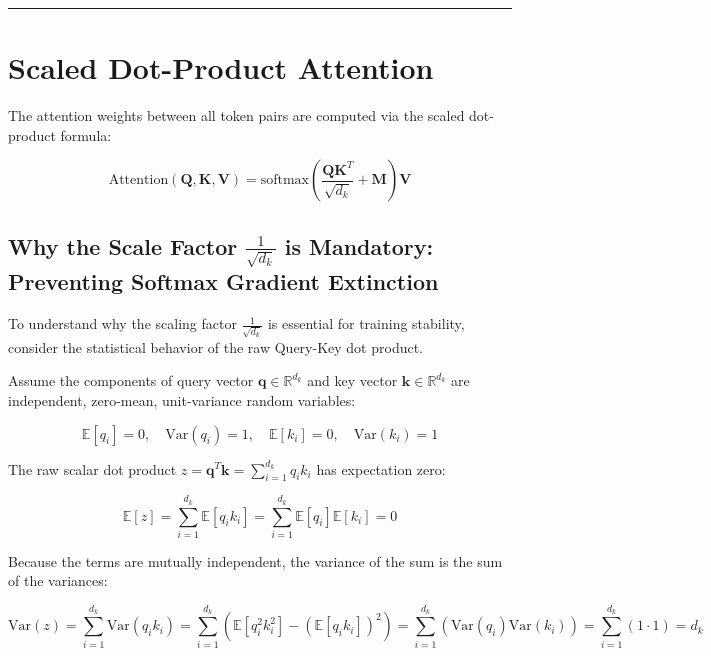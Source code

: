 \documentclass[
  letterpaper,
]{scrbook}
\begin{document}
\begin{center}\rule{0.5\linewidth}{0.5pt}\end{center}

\section{Scaled Dot-Product
Attention}\label{scaled-dot-product-attention}

The attention weights between all token pairs are computed via the
scaled dot-product formula:

\[\text{Attention}(\mathbf{Q}, \mathbf{K}, \mathbf{V}) = \text{softmax}\left( \frac{\mathbf{Q} \mathbf{K}^T}{\sqrt{d_k}} + \mathbf{M} \right) \mathbf{V}\]

\subsection{\texorpdfstring{Why the Scale Factor
\(\frac{1}{\sqrt{d_k}}\) is Mandatory: Preventing Softmax Gradient
Extinction}{Why the Scale Factor \textbackslash frac\{1\}\{\textbackslash sqrt\{d\_k\}\} is Mandatory: Preventing Softmax Gradient Extinction}}\label{why-the-scale-factor-frac1sqrtd_k-is-mandatory-preventing-softmax-gradient-extinction}

To understand why the scaling factor \(\frac{1}{\sqrt{d_k}}\) is
essential for training stability, consider the statistical behavior of
the raw Query-Key dot product.

Assume the components of query vector
\(\mathbf{q} \in \mathbb{R}^{d_k}\) and key vector
\(\mathbf{k} \in \mathbb{R}^{d_k}\) are independent, zero-mean,
unit-variance random variables:

\[\mathbb{E}[q_i] = 0, \quad \text{Var}(q_i) = 1, \quad \mathbb{E}[k_i] = 0, \quad \text{Var}(k_i) = 1\]

The raw scalar dot product
\(z = \mathbf{q}^T \mathbf{k} = \sum_{i=1}^{d_k} q_i k_i\) has
expectation zero:

\[\mathbb{E}[z] = \sum_{i=1}^{d_k} \mathbb{E}[q_i k_i] = \sum_{i=1}^{d_k} \mathbb{E}[q_i]\mathbb{E}[k_i] = 0\]

Because the terms are mutually independent, the variance of the sum is
the sum of the variances:

\[\text{Var}(z) = \sum_{i=1}^{d_k} \text{Var}(q_i k_i) = \sum_{i=1}^{d_k} \left( \mathbb{E}[q_i^2 k_i^2] - (\mathbb{E}[q_i k_i])^2 \right) = \sum_{i=1}^{d_k} (\text{Var}(q_i)\text{Var}(k_i)) = \sum_{i=1}^{d_k} (1 \cdot 1) = d_k\]
\end{document}
